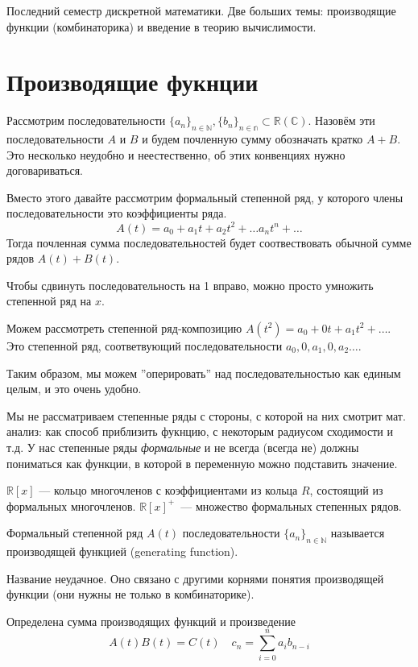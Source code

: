Последний семестр дискретной математики. 
Две больших темы: производящие функции (комбинаторика) и введение в теорию вычислимости. 

\section{Производящие фукнции}

Рассмотрим последовательности $\{ a_n\}_{n\in \mathbb{N}}, \{b_n\}_{n\in \mathbb{n}} \subset \mathbb{R}(\mathbb{C})$.
Назовём эти последовательности $A$ и $B$ и будем почленную сумму обозначать кратко $A+B$.
Это несколько неудобно и неестественно, об этих конвенциях нужно договариваться.

Вместо этого давайте рассмотрим формальный степенной ряд, у которого члены последовательности это коэффициенты ряда.
\[ A(t) = a_0 + a_1 t + a_2 t^2 + \ldots a_n t^n + \ldots\]
Тогда почленная сумма последовательностей будет соотвествовать обычной сумме рядов $A(t) + B(t)$.

Чтобы сдвинуть последовательность на 1 вправо, можно просто умножить степенной ряд на $x$. 

Можем рассмотреть степенной ряд-композицию $A(t^2) = a_0 + 0 t + a_1 t^2 + \ldots$. 
Это степенной ряд, соответвующий последовательности $a_0, 0, a_1, 0, a_2 \ldots$.

Таким образом, мы можем ''оперировать'' над последовательностью как единым целым, и это очень удобно.

Мы не рассматриваем степенные ряды с стороны, с которой на них смотрит мат. анализ: как способ приблизить фукнцию, с некоторым радиусом сходимости и т.д.
У нас степенные ряды {\it формальные} и не всегда (всегда не) должны пониматься как функции, в которой в переменную можно подставить значение.

$\mathbb{R}[x]$ --- кольцо многочленов с коэффициентами из кольца $R$, состоящий из формальных многочленов.
$\mathbb{R}[x]^+$~--- множество формальных степенных рядов.

\begin{definition}
Формальный степенной ряд $A(t)$ последовательности $\{a_n\}_{n\in \mathbb{N}}$ называется производящей функцией (generating function).  
\end{definition}

Название неудачное. 
Оно связано с другими корнями понятия производящей функции (они нужны не только в комбинаторике).

Определена сумма производящих функций и произведение 
\[ A(t) B(t) = C(t)\quad c_n = \sum_{i=0}^n a_ib_{n-i} \]


